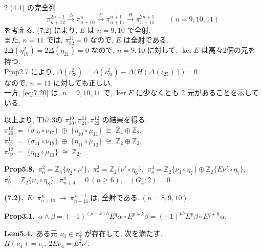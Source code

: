 \documentclass[10pt, leqno]{ltjsarticle}
\newcommand{\gen}[1]{\{#1\}}       %
\newcommand{\pit}[2]{\pi_{#1}^{#2}}
\numberwithin{equation}{section}
\theoremstyle{plain}
\theoremstyle{definition}
\theoremstyle{remark}
\begin{document}
\begin{paracol}{2}
(4.4) の完全列
\[
  \pit{n+12}{2n+1}\xrightarrow{\ \Delta\ }
  \pit{n+10}{n}\xrightarrow{\ E\ }
  \pit{n+11}{n+1}\xrightarrow{\ H\ }
  \pit{n+11}{2n+1}
  \qquad (n=9,10,11)
\]
を考える. (7.2) により, \(E\) は \(n=9,10\) で全射. \\
また, \(n=11\) では, \(\pit{22}{21}=0\) なので, \(E\) は全射である. \\
\(2\Delta(\eta_{19}^{2})=2\Delta(\eta_{21})=0\) なので, 
\(n=9,10\) に対して, \(\ker E\) は高々2個の元を持つ. \\
Prop2.7 により, 
\(
\Delta(\iota_{23}^{2})=
\Delta(\iota_{23}^{2})-\Delta\bigl(H(\Delta(\iota_{25}))\bigr)=0.
\)\\
なので, \(n=11\) に対しても正しい. \\ 
一方, \eqref{eq:7.20} は, \(n=9,10,11\) で, 
\(\ker E\) に少なくとも 2 元があることを示している. 

\noindent
以上より, Th7.3の
\(\pit{20}{10},\pit{21}{11},\pit{22}{12}\) の結果を得る.\\
\(
  \pit{20}{10} \;=\; \gen{\sigma_{10}\circ \nu_{17}} \;\oplus\; \gen{\eta_{10}\circ \mu_{11}}
    \;\cong\; \mathbb Z_{4}\oplus\mathbb Z_{2},
\)\\
\(
\pit{21}{11} \;=\; \gen{\sigma_{11}\circ \nu_{18}} \;\oplus\; \gen{\eta_{11}\circ \mu_{12}}
    \;\cong\; \mathbb Z_{2}\oplus\mathbb Z_{2},
\)\\
\(
\pit{22}{12} \;=\; \gen{\eta_{12}\circ \mu_{13}}
    \;\cong\; \mathbb Z_{2}.
\)

\switchcolumn

\noindent
\textbf{Prop5.8.}\
\(\pi^{2}_{6}=\mathbb Z_4\gen{\eta_{2}\circ\nu'},\) \quad
\(\pi^{3}_{7}=\mathbb Z_2\gen{\nu'\circ\eta_6},\) \quad
\(\pi^{4}_{8}=\mathbb Z_2\gen{\nu_{4}\circ\eta_7}\oplus \mathbb Z_2\gen{E\nu'\circ\eta_7},\) \\
\(\pi^{5}_{9}=\mathbb Z_2\gen{\nu_{5}\circ\eta_8},\) \quad
\(\pi^{n}_{n+4}=0\ (n\ge6),\) \
\((G_{4};2)=0.\)

\noindent
\textbf{(7.2).}\
\(E:\ \pit{n+10}{\,n}\ \longrightarrow\ \pit{n+11}{\,n+1}
\ \text{は, 全射である.}\ (n=8,9,10).\)

\noindent
\textbf{Prop3.1.}\
\(
\alpha \wedge \beta
= (-1)^{(p+k)h} E^{q}\alpha \circ E^{p+k}\beta
= (-1)^{ph} E^{p}\beta \circ E^{q+h}\alpha .
\)

\noindent
\textbf{Lem5.4.}\
ある元 \(\nu_{4}\in \pi^{4}_{7}\) が存在して, 次を満たす. \\
\(H(\nu_{4})=\iota_7,\ 2E \nu_{4}=E^{2}\nu' .\)


\end{paracol}
\end{document}

